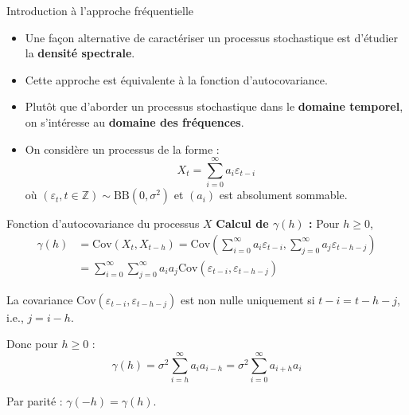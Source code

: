\documentclass[11pt,aspectratio=169]{beamer}
\newcommand{\Cov}{\mathrm{Cov}}
\newcommand{\Z}{\mathbb{Z}}
\begin{document}
\begin{frame}{Introduction à l'approche fréquentielle}

\begin{itemize}

\item Une façon alternative de caractériser un processus stochastique est d'étudier la \textbf{densité spectrale}.\newline

\item Cette approche est équivalente à la fonction d'autocovariance.\newline

\item Plutôt que d'aborder un processus stochastique dans le \textbf{domaine temporel}, on s'intéresse au \textbf{domaine des fréquences}.\newline

\item On considère un processus de la forme :
  \[
  X_t = \sum_{i=0}^{\infty} a_i \varepsilon_{t-i}
  \]
  où $(\varepsilon_t, t \in \Z) \sim \text{BB}(0, \sigma^2)$ et $(a_i)$ est absolument sommable.

\end{itemize}

\end{frame}

\begin{frame}{Fonction d'autocovariance du processus $X$}
\textbf{Calcul de $\gamma(h)$ :} Pour $h \geq 0$,
\begin{align*}
\gamma(h) &= \Cov(X_t, X_{t-h}) = \Cov\left( \sum_{i=0}^{\infty} a_i \varepsilon_{t-i}, \sum_{j=0}^{\infty} a_j \varepsilon_{t-h-j} \right) \\
&= \sum_{i=0}^{\infty} \sum_{j=0}^{\infty} a_i a_j \Cov(\varepsilon_{t-i}, \varepsilon_{t-h-j})
\end{align*}

La covariance $\Cov(\varepsilon_{t-i}, \varepsilon_{t-h-j})$ est non nulle uniquement si $t-i = t-h-j$, i.e., $j = i - h$.

\vspace{0.3cm}

Donc pour $h \geq 0$ :
\[
\gamma(h) = \sigma^2 \sum_{i=h}^{\infty} a_i a_{i-h} = \sigma^2 \sum_{i=0}^{\infty} a_{i+h} a_i
\]

Par parité : $\gamma(-h) = \gamma(h)$.
\end{frame}
\end{document}

